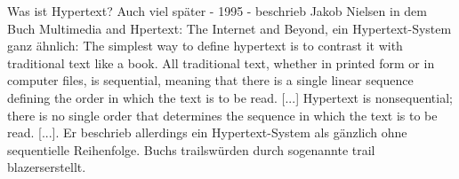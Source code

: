 \begin{section}{Was ist Hypertext?}
Auch viel später - 1995 - beschrieb Jakob Nielsen in dem Buch Multimedia and Hpertext: The Internet and Beyond, ein Hypertext-System ganz ähnlich: \glqq The simplest way to define hypertext is to contrast it with traditional text like a book. All traditional text, whether in printed form or in computer files, is sequential, meaning that there is a single linear sequence defining the order in which the text is to be read. [...] Hypertext is nonsequential; there is no single order that determines the sequence in which the text is to be read. [...]\grqq{ }\cite[S.1]{Nielsen1995}. Er beschrieb allerdings ein Hypertext-System als gänzlich ohne sequentielle Reihenfolge. Buchs \glqq trails\grqq{ }würden durch sogenannte \glqq trail blazers\grqq{ }erstellt\cite[S.35]{Nielsen1995}.

\end{section}
